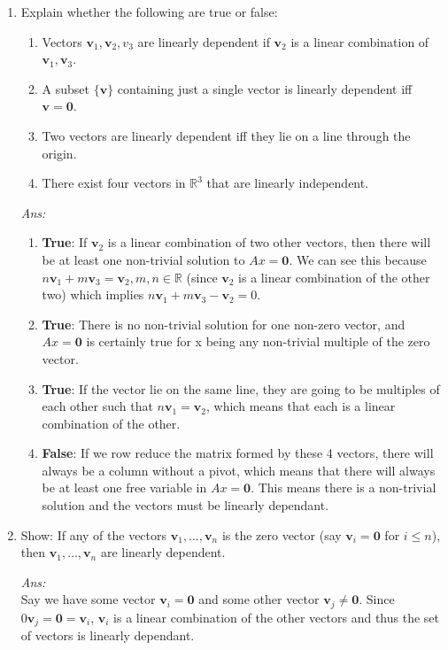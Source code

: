 \documentclass[12pt]{amsart}
\newcommand{\bo}{\mathbf{0}}
\newcommand{\bv}{\mathbf v}
\newcommand{\R}{\mathbb{R}}
\newcommand\sol[1]{
\medskip
\begin{mdframed}
\emph{Ans:\\} #1
\end{mdframed}
\medskip
}
\begin{document}
\begin{enumerate}
\item Explain whether the following are true or false: %
\begin{enumerate}
\item   
 Vectors $\bv_1,\bv_2, v_3$ are linearly dependent if $\bv_2$ is a linear combination of $\bv_1,\bv_3$.
\item
 A subset $\{ \bv \}$ containing just a single vector is linearly dependent iff $\bv=\bo$.
\item
 Two vectors are linearly dependent iff they lie on a line through the origin.  
\item
 There exist four vectors in $\R^3$ that are linearly independent.
\end{enumerate}


\sol{
  \begin{enumerate}
    \item \textbf{True}: If $\bv_2$ is a linear combination of two other vectors, then there will be at least one non-trivial solution to $Ax=\bo$. We can see this because $n\bv_1+m\bv_3=\bv_2, m,n\in\R$ (since $\bv_2$ is a linear combination of the other two) which implies $n\bv_1+m\bv_3-\bv_2=0$.
    \item \textbf{True}: There is no non-trivial solution for one non-zero vector, and $Ax=\bo$ is certainly true for x being any non-trivial multiple of the zero vector.
    \item \textbf{True}: If the vector lie on the same line, they are going to be multiples of each other such that $n\bv_1=\bv_2$, which means that each is a linear combination of the other.
    \item \textbf{False}: If we row reduce the matrix formed by these 4 vectors, there will always be a column without a pivot, which means that there will always be at least one free variable in $Ax=\bo$. This means there is a non-trivial solution and the vectors must be linearly dependant.
  \end{enumerate}
}


\item Show: If any of the vectors $\bv_1,\dots,\bv_n$ is the zero vector (say $\bv_i=\bo$ for $i\leq n$), then
 $\bv_1,\dots,\bv_n$ are linearly dependent.

 \sol{
  Say we have some vector $\bv_i=\bo$ and some other vector $\bv_j\ne\bo$. Since $0\bv_j=\bo=\bv_i$, $\bv_i$ is a linear combination of the other vectors and thus the set of vectors is linearly dependant.
 }


\end{enumerate}
\end{document}
